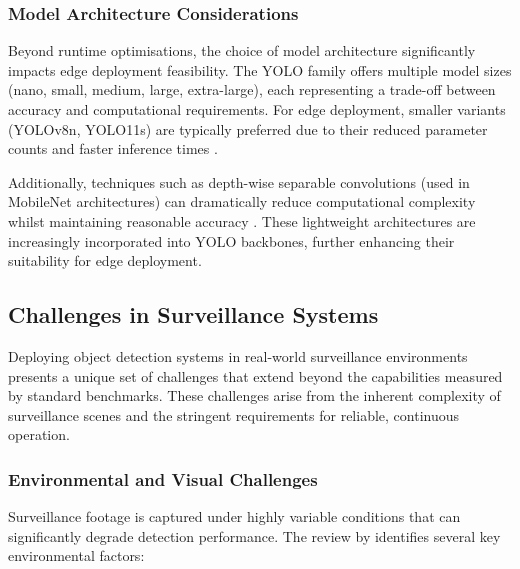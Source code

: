 \subsubsection{Model Architecture Considerations}

Beyond runtime optimisations, the choice of model architecture significantly
impacts edge deployment feasibility. The YOLO family offers multiple model
sizes (nano, small, medium, large, extra-large), each representing a trade-off
between accuracy and computational requirements. For edge deployment, smaller
variants (YOLOv8n, YOLO11s) are typically preferred due to their reduced
parameter counts and faster inference times \citep{abandoned2025vrsalovic}.

Additionally, techniques such as depth-wise separable convolutions (used in
MobileNet architectures) can dramatically reduce computational complexity
whilst maintaining reasonable accuracy \citep{chiu2020mobilenet}. These
lightweight architectures are increasingly incorporated into YOLO backbones,
further enhancing their suitability for edge deployment.

\subsection{Challenges in Surveillance Systems}

Deploying object detection systems in real-world surveillance environments
presents a unique set of challenges that extend beyond the capabilities
measured by standard benchmarks. These challenges arise from the inherent
complexity of surveillance scenes and the stringent requirements for reliable,
continuous operation.

\subsubsection{Environmental and Visual Challenges}

Surveillance footage is captured under highly variable conditions that can
significantly degrade detection performance. The review by
\citet{dubey2024critical} identifies several key environmental factors:

